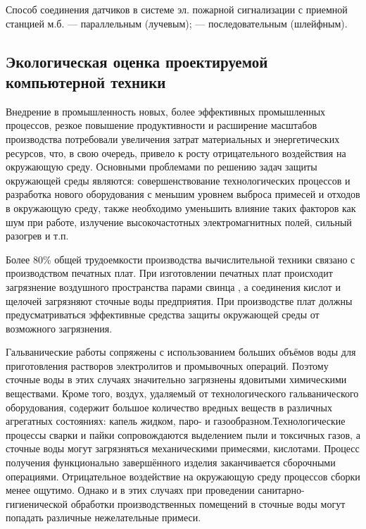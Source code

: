 Способ соединения датчиков в системе эл. пожарной сигнализации с приемной станцией м.б. — параллельным (лучевым);
— последовательным (шлейфным).

\subsection{Экологическая оценка проектируемой компьютерной техники}
Внедрение в промышленность новых, более эффективных промышленных процессов, резкое повышение продуктивности и расширение
масштабов производства потребовали увеличения затрат материальных и энергетических ресурсов, что, в свою очередь,
привело к росту отрицательного воздействия на окружающую среду. Основными проблемами по решению задач защиты окружающей
среды являются: совершенствование технологических процессов и разработка нового оборудования с меньшим уровнем выброса
примесей и отходов в окружающую среду, также необходимо уменьшить влияние таких факторов как шум при работе, излучение
высокочастотных электромагнитных полей, сильный разогрев и т.п.

Более 80\% общей трудоемкости производства вычислительной техники связано с производством печатных плат.
При изготовлении печатных плат происходит загрязнение воздушного пространства парами свинца \cite{bjd43}, а соединения кислот и
щелочей загрязняют сточные воды предприятия. При производстве плат должны предусматриваться эффективные средства
защиты окружающей среды от возможного загрязнения.

Гальванические работы сопряжены с использованием больших объёмов воды для приготовления растворов электролитов и
промывочных операций. Поэтому сточные воды в этих случаях значительно загрязнены ядовитыми химическими веществами.
Кроме того, воздух, удаляемый от технологического гальванического оборудования, содержит большое количество вредных
веществ в различных агрегатных состояниях: капель жидком, паро- и газообразном.Технологические процессы сварки и
пайки сопровождаются выделением пыли и токсичных газов, а сточные воды могут загрязняться механическими примесями,
кислотами. Процесс получения функционально завершённого изделия заканчивается сборочными операциями. Отрицательное
воздействие на окружающую среду процессов сборки менее ощутимо. Однако и в этих случаях при проведении
санитарно-гигиенической обработки производственных помещений в сточные воды могут попадать различные нежелательные примеси.


